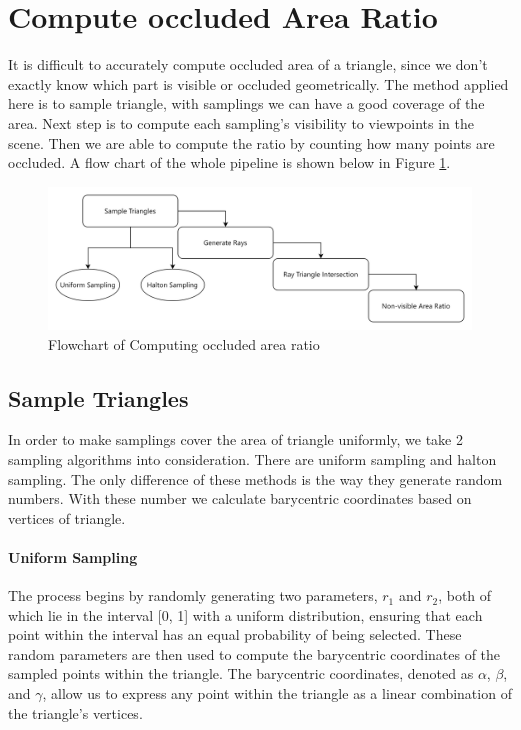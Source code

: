 \documentclass[11pt, a4paper,oneside,chapterprefix=false]{scrbook}
\begin{document}
\section{Compute occluded Area Ratio} \label{sec:compute occluded area ratio}

It is difficult to accurately compute occluded area of a triangle, since we don't exactly know which part is visible or occluded geometrically. The method applied here is to sample triangle, with samplings we can have a good coverage of the area. Next step is to compute each sampling's visibility to viewpoints in the scene. Then we are able to compute the ratio by counting how many points are occluded. A flow chart of the whole pipeline is shown below in Figure \ref{fig:flowchart of computing occluded area ratio}.

\begin{figure}[H]
    \centering
    \includegraphics*[width=1.0\textwidth]{figures/Compute occluded Area Ratio.png}
    \caption{Flowchart of Computing occluded area ratio}
    \label{fig:flowchart of computing occluded area ratio}
\end{figure}

\subsection{Sample Triangles} \label{subsec:sample triangle}

In order to make samplings cover the area of triangle uniformly, we take 2 sampling algorithms into consideration. There are uniform sampling and halton sampling. The only difference of these methods is the way they generate random numbers. With these number we calculate barycentric coordinates based on vertices of triangle. 

\paragraph{Uniform Sampling}

The process begins by randomly generating two parameters, \( r_1 \) and \( r_2 \), both of which lie in the interval [0, 1] with a uniform distribution, ensuring that each point within the interval has an equal probability of being selected. These random parameters are then used to compute the barycentric coordinates of the sampled points within the triangle. The barycentric coordinates, denoted as \( \alpha \), \( \beta \), and \( \gamma \), allow us to express any point within the triangle as a linear combination of the triangle's vertices.
\end{document}
